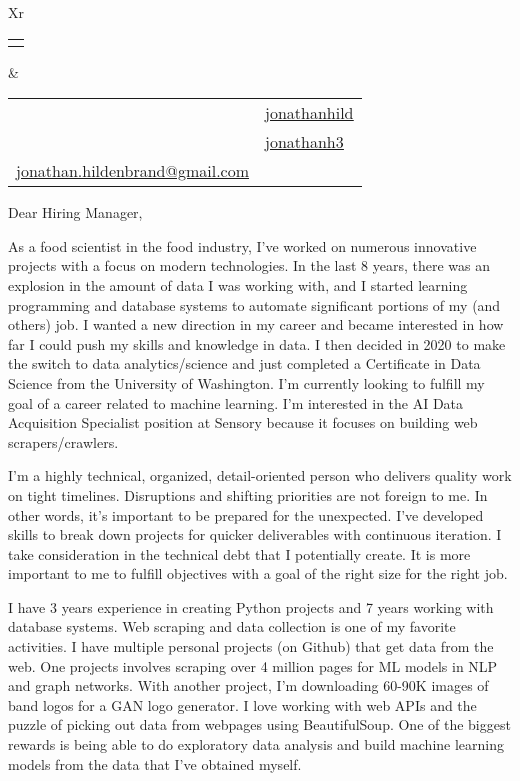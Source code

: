 \documentclass[letterpaper,12pt]{article}[leftmargin=*]
\makeatletter
\def\fullname{Jonathan Hildenbrand}
\def\githubicon{\faGithub}
\def\githublink{https://github.com/jonathanhild}
\def\githubtext{jonathanhild}
\def\linkedinicon{\faLinkedin}
\def\linkedinlink{https://linkedin.com/in/jonathanh3}
\def\linkedintext{jonathanh3}
\def\phoneicon{\faPhone}
\def\phonetext{+1-971-409-0695}
\def\emailicon{\faEnvelope}
\def\emaillink{mailto:jonathan.hildenbrand+resume@gmail.com}
\def\emailtext{jonathan.hildenbrand@gmail.com}
\def\locationicon{\faMapMarker}
\def\locationtext{Portland, Oregon}
\def\targeticon{\faBinoculars}
\def\targettext{Local \& Remote}
\def\headertype{\doublecol} %
\def\location{\hspace{3pt}\locationicon \hspace{5pt}{\color{links}\locationtext}}
\def\target{\targeticon\hspace{3pt}{\color{links}\targettext}}
\def\phone{\phoneicon\hspace{3pt}{\color{links}{\phonetext}}}
\def\linkedin{\linkedinicon\hspace{3pt}\href{\linkedinlink}{\underline{\linkedintext}}}
\def\email{\emailicon\hspace{3pt}\href{\emaillink}{\underline{\emailtext}}}
\def\github{\githubicon\hspace{3pt}\href{\githublink}{\underline{\githubtext}}}
\newcommand{\doublecol}[6]{
  \begin{tabularx}{\textwidth}{Xr}
    {
      \begin{tabular}[c]{l}
        \fontsize{24}{34}\selectfont{\color{primary}{{\textbf{\fullname}}}}
      \end{tabular}
    } & {
      \begin{tabular}[c]{l@{\hspace{1.5em}} l}
        {\small#4} & {\small#1} \\
        {\small#5} & {\small#2} \\
        {\small#6} & {\small#3}
      \end{tabular}
    }
  \end{tabularx}
}
\makeatother
\begin{document}
\headertype{\github}{\linkedin}{\phone}{\location}{\target}{\email} %

\vspace{48pt}

Dear Hiring Manager,

\vspace{24pt}

\hspace{24pt}
As a food scientist in the food industry, I've worked on numerous innovative projects with a focus on modern technologies. In the last 8 years, there was an explosion in the amount of data I was working with, and I started learning programming and database systems to automate significant portions of my (and others) job. I wanted a new direction in my career and became interested in how far I could push my skills and knowledge in data. I then decided in 2020 to make the switch to data analytics/science and just completed a Certificate in Data Science from the University of Washington.
I'm currently looking to fulfill my goal of a career related to machine learning.
I'm interested in the AI Data Acquisition Specialist position at Sensory because it focuses on building web scrapers/crawlers.

\vspace{12pt}

\hspace{24pt}
I'm a highly technical, organized, detail-oriented person who delivers quality work on tight timelines. Disruptions and shifting priorities are not foreign to me. In other words, it's important to be prepared for the unexpected. I've developed skills to break down projects for quicker deliverables with continuous iteration. I take consideration in the technical debt that I potentially create. It is more important to me to fulfill objectives with a goal of the right size for the right job.

\vspace{12pt}

\hspace{24pt}
I have 3 years experience in creating Python projects and 7 years working with database systems. Web scraping and data collection is one of my favorite activities. I have multiple personal projects (on Github) that get data from the web. One projects involves scraping over 4 million pages for ML models in NLP and graph networks. With another project, I'm downloading 60-90K images of band logos for a GAN logo generator. I love working with web APIs and the puzzle of picking out data from webpages using BeautifulSoup. One of the biggest rewards is being able to do exploratory data analysis and build machine learning models from the data that I've obtained myself.
\end{document}

